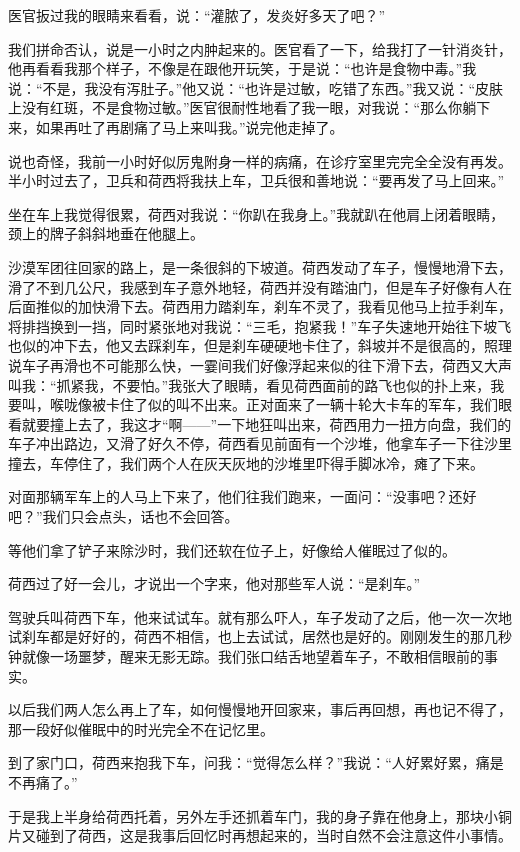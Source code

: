 \par 医官扳过我的眼睛来看看，说：“灌脓了，发炎好多天了吧？”
\par 我们拼命否认，说是一小时之内肿起来的。医官看了一下，给我打了一针消炎针，他再看看我那个样子，不像是在跟他开玩笑，于是说：“也许是食物中毒。”我说：“不是，我没有泻肚子。”他又说：“也许是过敏，吃错了东西。”我又说：“皮肤上没有红斑，不是食物过敏。”医官很耐性地看了我一眼，对我说：“那么你躺下来，如果再吐了再剧痛了马上来叫我。”说完他走掉了。
\par 说也奇怪，我前一小时好似厉鬼附身一样的病痛，在诊疗室里完完全全没有再发。半小时过去了，卫兵和荷西将我扶上车，卫兵很和善地说：“要再发了马上回来。”
\par 坐在车上我觉得很累，荷西对我说：“你趴在我身上。”我就趴在他肩上闭着眼睛，颈上的牌子斜斜地垂在他腿上。
\par 沙漠军团往回家的路上，是一条很斜的下坡道。荷西发动了车子，慢慢地滑下去，滑了不到几公尺，我感到车子意外地轻，荷西并没有踏油门，但是车子好像有人在后面推似的加快滑下去。荷西用力踏刹车，刹车不灵了，我看见他马上拉手刹车，将排挡换到一挡，同时紧张地对我说：“三毛，抱紧我！”车子失速地开始往下坡飞也似的冲下去，他又去踩刹车，但是刹车硬硬地卡住了，斜坡并不是很高的，照理说车子再滑也不可能那么快，一霎间我们好像浮起来似的往下滑下去，荷西又大声叫我：“抓紧我，不要怕。”我张大了眼睛，看见荷西面前的路飞也似的扑上来，我要叫，喉咙像被卡住了似的叫不出来。正对面来了一辆十轮大卡车的军车，我们眼看就要撞上去了，我这才“啊——”一下地狂叫出来，荷西用力一扭方向盘，我们的车子冲出路边，又滑了好久不停，荷西看见前面有一个沙堆，他拿车子一下往沙里撞去，车停住了，我们两个人在灰天灰地的沙堆里吓得手脚冰冷，瘫了下来。
\par 对面那辆军车上的人马上下来了，他们往我们跑来，一面问：“没事吧？还好吧？”我们只会点头，话也不会回答。
\par 等他们拿了铲子来除沙时，我们还软在位子上，好像给人催眠过了似的。
\par 荷西过了好一会儿，才说出一个字来，他对那些军人说：“是刹车。”
\par 驾驶兵叫荷西下车，他来试试车。就有那么吓人，车子发动了之后，他一次一次地试刹车都是好好的，荷西不相信，也上去试试，居然也是好的。刚刚发生的那几秒钟就像一场噩梦，醒来无影无踪。我们张口结舌地望着车子，不敢相信眼前的事实。
\par 以后我们两人怎么再上了车，如何慢慢地开回家来，事后再回想，再也记不得了，那一段好似催眠中的时光完全不在记忆里。
\par 到了家门口，荷西来抱我下车，问我：“觉得怎么样？”我说：“人好累好累，痛是不再痛了。”
\par 于是我上半身给荷西托着，另外左手还抓着车门，我的身子靠在他身上，那块小铜片又碰到了荷西，这是我事后回忆时再想起来的，当时自然不会注意这件小事情。
